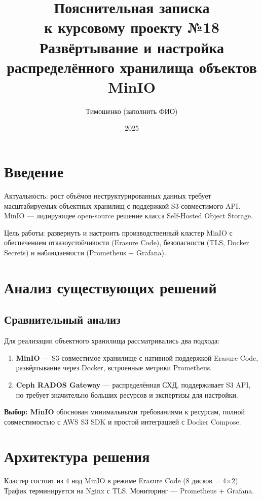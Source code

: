 \documentclass[14pt,a4paper]{extreport}
\title{Пояснительная записка\\к курсовому проекту №18\\
\large Развёртывание и настройка распределённого хранилища объектов MinIO}
\author{Тимошенко (заполнить ФИО)}
\date{2025}
\begin{document}
\maketitle
\tableofcontents

\chapter{Введение}

Актуальность: рост объёмов неструктурированных данных требует масштабируемых объектных
хранилищ с поддержкой S3-совместимого API. MinIO — лидирующее open-source решение класса
Self-Hosted Object Storage.

Цель работы: развернуть и настроить производственный кластер MinIO с обеспечением
отказоустойчивости (Erasure Code), безопасности (TLS, Docker Secrets) и наблюдаемости
(Prometheus + Grafana).

\chapter{Анализ существующих решений}

\section{Сравнительный анализ}

Для реализации объектного хранилища рассматривались два подхода:
\begin{enumerate}
  \item \textbf{MinIO} — S3-совместимое хранилище с нативной поддержкой Erasure Code,
        развёртывание через Docker, встроенные метрики Prometheus.
  \item \textbf{Ceph RADOS Gateway} — распределённая СХД, поддерживает S3 API,
        но требует значительно больших ресурсов и экспертизы для настройки.
\end{enumerate}

\textbf{Выбор: MinIO} обоснован минимальными требованиями к ресурсам,
полной совместимостью с AWS S3 SDK и простой интеграцией с Docker Compose.

\chapter{Архитектура решения}

Кластер состоит из 4 нод MinIO в режиме Erasure Code (8 дисков = 4$\times$2).
Трафик терминируется на Nginx с TLS. Мониторинг — Prometheus + Grafana.
\end{document}
